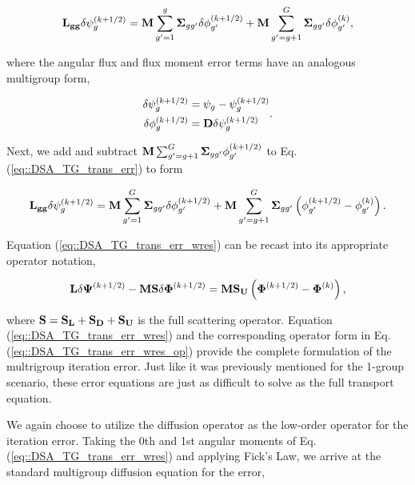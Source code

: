 \begin{equation}
\label{eq::DSA_TG_trans_err}
{\bf L_{gg}} \delta \psi_g^{(k+1/2)} = {\bf M} \sum_{g'=1}^g {\bf \Sigma}_{g g'}\delta \phi_{g'}^{(k+1/2)} + {\bf M} \sum_{g'=g+1}^G {\bf \Sigma}_{g g'} \delta \phi_{g'}^{(k)},
\end{equation}

\noindent where the angular flux and flux moment error terms have an analogous multigroup form,

\begin{equation}
\label{eq::DSA_TG_error_terms}
\begin{aligned}
\delta \psi_g^{(k+1/2)} &= \psi_g - \psi_g^{(k+1/2)} \\
\delta \phi_g^{(k+1/2)} &= {\bf D} \delta \psi_g^{(k+1/2)}
\end{aligned} .
\end{equation}

\noindent Next, we add and subtract ${\bf M} \sum_{g'=g+1}^G {\bf \Sigma}_{g g'} \phi_{g'}^{(k+1/2)}$ to Eq. (\ref{eq::DSA_TG_trans_err}) to form

\begin{equation}
\label{eq::DSA_TG_trans_err_wres}
{\bf L_{gg}} \delta \psi_g^{(k+1/2)} = {\bf M} \sum_{g'=1}^G {\bf \Sigma}_{g g'}\delta \phi_{g'}^{(k+1/2)} + {\bf M} \sum_{g'=g+1}^G {\bf \Sigma}_{g g'} \left( \phi_{g'}^{(k+1/2)} - \phi_{g'}^{(k)} \right) .
\end{equation}

\noindent Equation (\ref{eq::DSA_TG_trans_err_wres}) can be recast into its appropriate operator notation,

\begin{equation}
\label{eq::DSA_TG_trans_err_wres_op}
{\bf L} \delta {\bf \Psi}^{(k+1/2)} - {\bf M}   {\bf S} \delta {\bf \Phi}^{(k+1/2)} = {\bf M} {\bf S_U}  \left( {\bf \Phi}^{(k+1/2)} - {\bf \Phi}^{(k)} \right),
\end{equation}

\noindent where ${\bf S} = {\bf S_L} + {\bf S_D} +{\bf S_U} $ is the full scattering operator. Equation (\ref{eq::DSA_TG_trans_err_wres}) and the corresponding operator form in Eq. (\ref{eq::DSA_TG_trans_err_wres_op}) provide the complete formulation of the multrigroup iteration error. Just like it was previously mentioned for the 1-group scenario, these error equations are just as difficult to solve as the full transport equation. 

We again choose to utilize the diffusion operator as the low-order operator for the iteration error. Taking the 0th and 1st angular moments of Eq. (\ref{eq::DSA_TG_trans_err_wres}) and applying Fick's Law, we arrive at the standard multigroup diffusion equation for the error,

